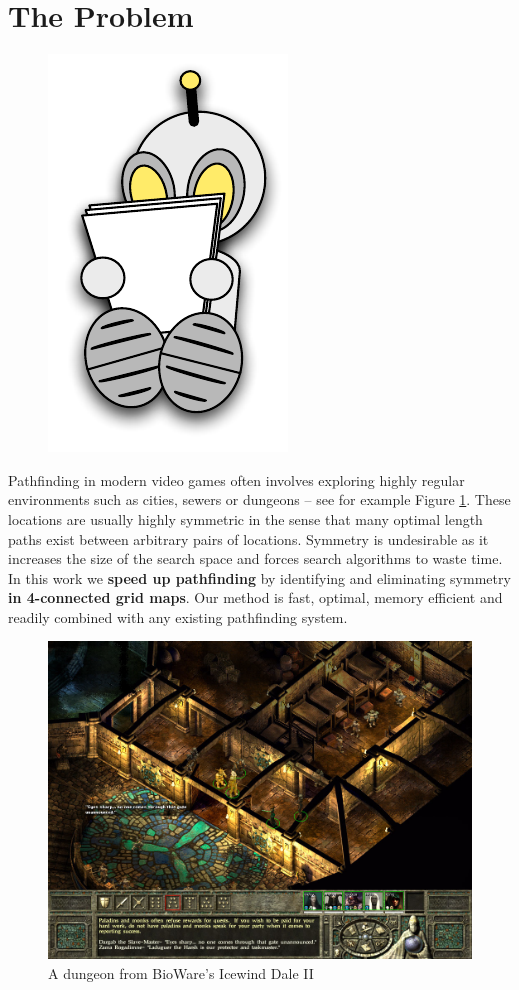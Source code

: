 \section{The Problem}
 \begin{figure}
\vspace{-3em}
		\includegraphics[width=0.18\columnwidth]{diagrams/robot_reading.pdf}
 \end{figure}

Pathfinding in modern video games often involves exploring highly regular 
environments such as cities, sewers or dungeons -- see for example
Figure \ref{fig:iw2}.
These locations are usually highly symmetric in the sense that many optimal 
length paths exist between arbitrary pairs of locations.
Symmetry is undesirable as it increases the size of the search space and forces
search algorithms to waste time.
\newline \newline
In this work we \textbf{speed up pathfinding} by identifying and eliminating
symmetry \textbf{in 4-connected grid maps}.
Our method is fast, optimal, memory efficient and readily combined with any
existing pathfinding system.

 \begin{figure}[h]
	\vspace{1em}
	\centering
	\label{fig:iw2}
		\includegraphics[width=\columnwidth]{diagrams/iwdale.jpg}
 \caption{A dungeon from BioWare's Icewind Dale II}
 \end{figure}

